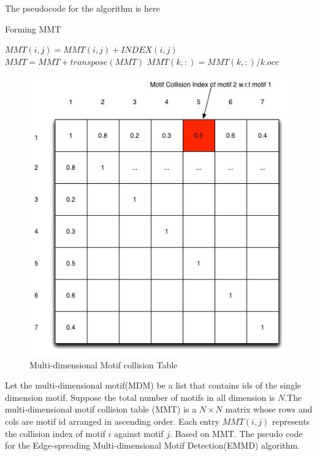 \documentclass{article}
\begin{document}
The pseudocode for the algorithm is here
\begin{algorithm}
\caption{Forming MMT}
\begin{algorithmic}
\STATE $MMT(i,j) = MMT(i,j) + INDEX(i,j)$
\ENDIF
\ENDFOR
\ENDFOR
\STATE $MMT = MMT + transpose(MMT)$
\STATE $MMT(k,:) = MMT(k,:)/k.occ$
\ENDFOR
\end{algorithmic}
\end{algorithm}

\begin{figure}
  \centering
  \includegraphics[scale=0.3]{MMT}
  \caption{Multi-dimensional Motif collision Table}
\end{figure}

Let the multi-dimensional motif(MDM) be a list that contains ids of the single dimension motif. 
Suppose the total number of motifs in all dimension is $N$.The multi-dimensional motif collision table (MMT) is a $N \times N$ matrix whose rows and cols are motif id arranged in ascending order. Each entry $MMT(i,j)$ represents the collision index of motif $i$ against motif $j$. Based on MMT. The pseudo code for the Edge-spreading Multi-dimensional Motif Detection(EMMD) algorithm. 
\end{document}
